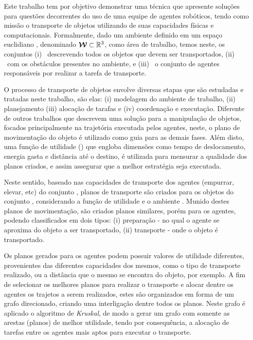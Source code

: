 \documentclass[12pt]{article}
\begin{document}
Este trabalho tem por objetivo demonstrar uma técnica que apresente soluções para questões decorrentes do uso de uma equipe de agentes robóticos, tendo como missão o transporte de objetos utilizando de suas capacidades físicas e computacionais.
Formalmente, dado um ambiente definido em um espaço euclidiano \environment, denominado $\boldsymbol{\mathcal{W}} \subset \mathbb{R}^3$, como área de trabalho, temos neste, os conjuntos (i) \objectset\ descrevendo todos os objetos que devem ser transportados, (ii) \obstacleset\ com os obstáculos presentes no ambiente, e (iii) \robotset\ o conjunto de agentes responsáveis por realizar a tarefa de transporte.


O processo de transporte de objetos envolve diversas etapas que são estudadas e tratadas neste trabalho, são elas: (i) modelagem do ambiente de trabalho, (ii) planejamento (iii) alocação de tarafas e (iv) coordenação e executação.
Diferente de outros trabalhos que descrevem uma solução para a manipulação de objetos, focados principalmente na trajetória executada pelos agentes, neste, o plano de movimentação do objeto é utilizado como guia para as demais fases.
Além disto, uma função de utilidade (\utilityfunction) que engloba dimensões como tempo de deslocamento, energia gasta e distância até o destino, é utilizada para mensurar a qualidade dos planos criados, e assim assegurar que a melhor estratégia seja executada.

Neste sentido, baseado nas capacidades de transporte dos agentes (empurrar, elevar, etc) do conjunto \robotset, planos de transporte são criados para os objetos do conjunto \objectset, considerando a função de utilidade \utilityfunction e o ambiente \workspace.
Munido destes planos de movimentação, são criados planos similares, porém para os agentes, podendo classificados em dois tipos: (i) preparação - no qual o agente se aproxima do objeto a ser transportado, (ii) transporte - onde o objeto é transportado.

Os planos gerados para os agentes podem possuir valores de utilidade diferentes, provenientes das diferentes capacidades dos mesmos, como o tipo de transporte realizado, ou a distância que o mesmo se encontra do objeto, por exemplo.
A fim de selecionar os melhores planos para realizar o transporte e alocar dentre os agentes os trajetos a serem realizados, estes são organizados em forma de um grafo direcionado, criando uma interligação dentre todos os planos.
Neste grafo é aplicado o algoritmo de \emph{Kruskal}, de modo a gerar um grafo com somente as arestas (planos) de melhor utilidade, tendo por consequência, a alocação de tarefas entre os agentes mais aptos para executar o transporte.
\end{document}
